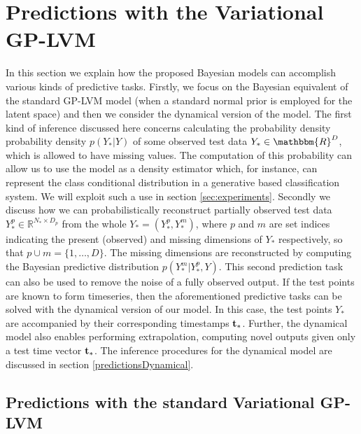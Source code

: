 
\section{Predictions with the Variational GP-LVM \label{section:predictions}} 

In this section we explain how the proposed Bayesian models
can accomplish various kinds of predictive tasks.
Firstly, we focus on the Bayesian equivalent of the standard GP-LVM model
(\ie when a standard normal prior is employed for the latent space) and
then we consider the dynamical version of the model.
The first kind of inference discussed here concerns calculating the probability density
probability density $p(Y_* | Y)$ of some observed test data
$Y_* \in \mathbbm{R}^D $, which is allowed to have missing
values. The computation of this probability can allow us to use the
model as a density estimator which, for instance, can represent the
class conditional distribution in a generative based classification
system.  We will exploit such a use in section \ref{sec:experiments}.
Secondly we discuss how we can probabilistically reconstruct 
 partially observed test data  $Y_*^{p} \in \mathbb{R}^{N_* \times D_p}$ from the whole $Y_*
= (Y_*^{p}, Y_*^{m})$, where $p$ and $m$ are set indices indicating
the present (\ie observed) and missing dimensions of $Y_*$
respectively, so that $p \cup m= \{1,\ldots,D\}$.
The missing dimensions are reconstructed by computing the
Bayesian predictive distribution $p(Y_*^{m}| Y_*^{p}, Y)$.
This second prediction task can also be used to 
remove the noise of a fully observed output. 
If the test points are known to form timeseries, then the aforementioned predictive
tasks can be solved with the dynamical version of our model.
In this case, the test points $Y_*$ are accompanied by their
corresponding timestamps $\mathbf{t}_*$. Further, the dynamical model also enables performing
extrapolation, \ie computing novel outputs given only a test time vector $\mathbf{t}_*$.
The inference procedures for the dynamical model are discussed in section \ref{predictionsDynamical}.


\subsection{Predictions with the standard Variational GP-LVM}

